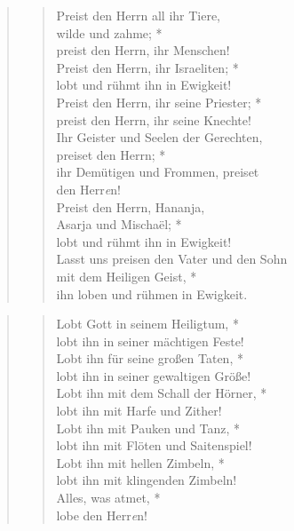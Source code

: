 \begin{quote}
\begin{verse}
\vin Preist den Herrn all ihr Tiere,\\
\vin wilde und zahme; *\\
\vin preist den Herrn, ihr Menschen!\\
Preist den Herrn, ihr Israeliten; *\\
lobt und rühmt ihn in Ewigkeit!\\
\vin Preist den Herrn, ihr seine Priester; *\\
\vin preist den Herrn, ihr seine Knechte!\\
Ihr Geister und Seelen der Gerechten,\\
preiset den Herrn; *\\
ihr Demütigen und Frommen, preiset\\ den Herr\textit{e}n!\\
\vin Preist den Herrn, Hananja,\\
\vin Asarja und Mischaël; *\\
\vin lobt und rühmt ihn in Ewigkeit!\\
Lasst uns preisen den Vater und den Sohn\\
mit dem Heiligen Geist, *\\
ihn loben und rühmen in Ewigkeit.\\ 

\end{verse}
\end{quote}


\vspace{0.3cm}

\begin{quote}
\begin{verse}
 Lobt Gott in seinem Heiligtum, *\\
lobt ihn in seiner mächtigen Feste! \\
\vin Lobt ihn für seine großen Taten, *\\
\vin lobt ihn in seiner gewaltigen Größe!\\
Lobt ihn mit dem Schall der Hörner, *\\
lobt ihn mit Harfe und Zither! \\
\vin Lobt ihn mit Pauken und Tanz, *\\
\vin lobt ihn mit Flöten und Saitenspiel! \\
Lobt ihn mit hellen Zimbeln, *\\
lobt ihn mit klingenden Zimbeln!\\
\vin Alles, was atmet, *\\
\vin lobe den Herr\textit{e}n!\\

\end{verse}
\end{quote}


